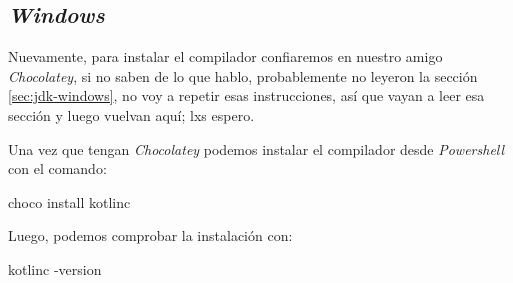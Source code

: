 \subsection{\textit{Windows}}
  Nuevamente, para instalar el compilador confiaremos en nuestro amigo 
  \textit{Chocolatey}, si no saben de lo que hablo, probablemente no leyeron la
  sección \ref{sec:jdk-windows}, no voy a repetir esas instrucciones, así que vayan a leer esa
  sección y luego vuelvan aquí; lxs espero.

  Una vez que tengan \textit{Chocolatey} podemos instalar el compilador desde \textit{Powershell}
  con el comando:

  \begin{powershell}
    choco install kotlinc
  \end{powershell}

  Luego, podemos comprobar la instalación con:
  \begin{powershell}
    kotlinc -version
  \end{powershell}